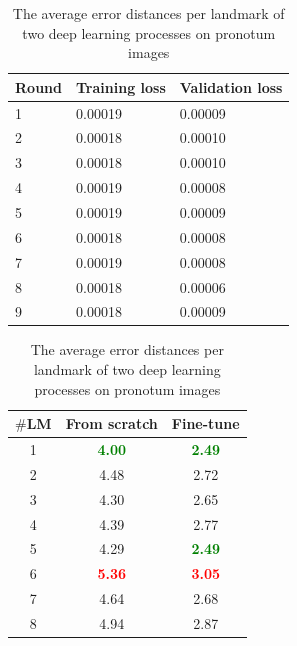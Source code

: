 \documentclass[review]{elsarticle}
\begin{document}
\begin{table}[htbp]
	\begin{minipage}[t]{0.45\textwidth}
	\centering
	\begin{tabular}{l p{1.5cm} p{1.5cm}}
	Round & Training loss & Validation loss \\ \hline
	1 & 0.00019 & 0.00009  \\ \hline
	2 & 0.00018 & 0.00010 \\ \hline
	3 & 0.00018 & 0.00010 \\ \hline
	4 & 0.00019 & 0.00008 \\ \hline
	5 & 0.00019 & 0.00009 \\ \hline
	6 & 0.00018 & 0.00008 \\ \hline
	7 & 0.00019 & 0.00008 \\ \hline
	8 & 0.00018 & 0.00006 \\ \hline
	9 & 0.00018 & 0.00009 \\ \hline
	\end{tabular}
	\caption{The losses during fine-tuning model on pronotum dataset}
	\label{tblftpronotum}
\end{minipage}
\hfill
\begin{minipage}[t]{0.45\textwidth}
\centering
\begin{tabular}{|c|c|c|}
\hline
\textbf{$\#$LM} & \textbf{From scratch} & \textbf{Fine-tune} \\ \hline
1 & \textcolor{green}{\textbf{4.00 }}& \textcolor{green}{\textbf{2.49}}  \\ \hline
2 & 4.48 & 2.72  \\ \hline
3 & 4.30  & 2.65 \\ \hline
4 & 4.39  & 2.77 \\ \hline
5 & 4.29  & \textcolor{green}{\textbf{2.49}} \\ \hline
6 & \textcolor{red}{\textbf{5.36}}  & \textcolor{red}{\textbf{3.05}} \\ \hline
7 & 4.64  & 2.68 \\ \hline
8 & 4.94  & 2.87 \\ \hline
\end{tabular}
\caption{The average error distances per landmark of two deep learning processes on pronotum images}
\label{tblcmppronotum}
\end{minipage}
\end{table}
\end{document}
